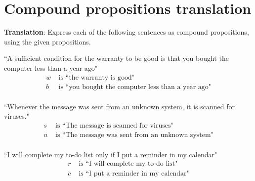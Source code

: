 \documentclass[12pt, oneside]{article}
\begin{document}
    \vfill
    \vfill \vfill
\section*{Compound propositions translation}


{\bf Translation}: Express each of the following sentences as compound propositions, using
the given propositions.

\begin{multicols}{2}
``A sufficient condition for the warranty to be good is that you bought the computer less than a year ago"
\columnbreak
\begin{align*}
w &\text{ is  ``the warranty is good"} \\
b &\text{ is  ``you bought the computer less than a year ago"} \\
\end{align*}
\end{multicols}
\vfill

\begin{multicols}{2}
``Whenever the message was sent from an unknown system, it is scanned for viruses."
\columnbreak
\begin{align*}
s &\text{ is  ``The message is scanned for viruses"} \\
u &\text{ is  ``The message was sent from an unknown system"} \\
\end{align*}
\end{multicols}
\vfill

\begin{multicols}{2}
``I will complete my to-do list only if I put a reminder in my calendar"
\columnbreak
\begin{align*}
r &\text{ is  ``I will complete my to-do list"} \\
c &\text{ is  ``I put a reminder in my calendar"} \\
\end{align*}
\end{multicols}
\vfill \vfill
\end{document}
